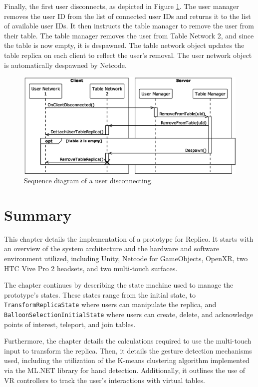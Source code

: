         Finally, the first user disconnects, as depicted in Figure \ref{fig:disconnect}. The user manager removes the user ID from the list of connected user IDs and returns it to the list of available user IDs. It then instructs the table manager to remove the user from their table. The table manager removes the user from Table Network 2, and since the table is now empty, it is despawned. The table network object updates the table replica on each client to reflect the user's removal. The user network object is automatically despawned by Netcode.

         \begin{figure}[h]
            \centering
            \includegraphics[width=.85\linewidth]{diagrams/out/disconnect.eps}
            \caption{Sequence diagram of a user disconnecting.}
            \label{fig:disconnect}
        \end{figure}

\section{Summary}
    This chapter details the implementation of a prototype for Replico. It starts with an overview of the system architecture and the hardware and software environment utilized, including Unity, Netcode for GameObjects, OpenXR, two HTC Vive Pro 2 headsets, and two multi-touch surfaces.

    The chapter continues by describing the state machine used to manage the prototype's states. These states range from the initial state, to \lstinline{TransformReplicaState} where users can manipulate the replica, and \lstinline{BalloonSelectionInitialState} where users can create, delete, and acknowledge points of interest, teleport, and join tables.

    Furthermore, the chapter details the calculations required to use the multi-touch input to transform the replica. Then, it details the gesture detection mechanisms used, including the utilization of the K-means clustering algorithm implemented via the ML.NET library for hand detection. Additionally, it outlines the use of VR controllers to track the user's interactions with virtual tables.


